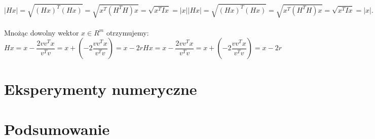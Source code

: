 \documentclass[10pt,a4paper]{report}
\begin{document}
$${\displaystyle |Hx|={\sqrt {(Hx)^{T}(Hx)}}={\sqrt {x^{T}(H^{T}H)x}}={\sqrt {x^{T}Ix}}=|x|} {\displaystyle |Hx|={\sqrt {(Hx)^{T}(Hx)}}={\sqrt {x^{T}(H^{T}H)x}}={\sqrt {x^{T}Ix}}=|x|}. $$\\
Mnożąc dowolny wektor ${\displaystyle x\in R^{m}}$ otrzymujemy:\\

$${\displaystyle Hx=x-{\frac {2vv^{T}x}{v^{T}v}}=x+(-2{\frac {vv^{T}x}{v^{T}v}})=x-2r} {\displaystyle Hx=x-{\frac {2vv^{T}x}{v^{T}v}}=x+(-2{\frac {vv^{T}x}{v^{T}v}})=x-2r}$$





\chapter{Eksperymenty numeryczne}

\chapter{Podsumowanie}
\end{document}
